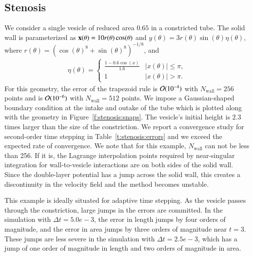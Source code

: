 \subsection{Stenosis}

We consider a single vesicle of reduced area $0.65$ in a constricted
tube.  The solid wall is parameterized as ${\mathbf{x}}(\theta) =
10r(\theta)\cos(\theta)$ and $y(\theta) =
3r(\theta)\sin(\theta)\eta(\theta)$, where $r(\theta) =
(\cos(\theta)^{8} + \sin(\theta)^{8})^{-1/8}$, and
\begin{align*}
  \eta(\theta) = \left\{
    \begin{array}{cl}
      \frac{1-0.6\cos(x)}{1.6} & |x(\theta)| \leq \pi, \\
      1 & |x(\theta)| > \pi.
    \end{array}
  \right.
\end{align*}
For this geometry, the error of the trapezoid rule is $\mathcal{O}(10^{-4})$
with $N_{\mathrm{wall}}=256$ points and is $\mathcal{O}(10^{-6})$ with
$N_{\mathrm{wall}}=512$ points.  We impose a Gaussian-shaped boundary
condition at the intake and outake of the tube which is plotted along
with the geometry in Figure~\ref{f:stenosis:snaps}.  The vesicle's
initial height is $2.3$ times larger than the size of the constriction.
We report a convergence study for second-order time stepping in
Table~\ref{t:stenosis:errors} and we exceed the expected rate of
convergence.  We note that for this example, $N_{\mathrm{wall}}$ can not
be less than 256.  If it is, the Lagrange interpolation points required
by near-singular integration for wall-to-vesicle interactions are on
both sides of the solid wall.  Since the double-layer potential has a
jump across the solid wall, this creates a discontinuity in the velocity
field and the method becomes unstable.

This example is ideally situated for adaptive time stepping.  As the
vesicle passes through the constriction, large jumps in the errors are
committed.  In the simulation with $\Delta t = 5.0e-3$, the error in
length jumps by four orders of magnitude, and the error in area jumps
by three orders of magnitude near $t=3$.  These jumps are less severe
in the simulation with $\Delta t = 2.5e-3$, which has a jump of one
order of magnitude in length and two orders of magnitude in area.


